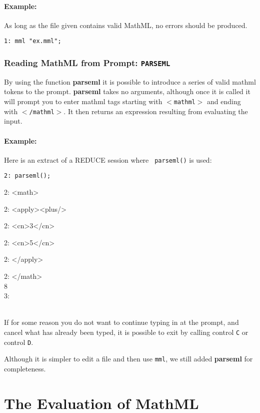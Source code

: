 \documentclass{article}
\begin{document}
\paragraph{Example:} As long as the file given contains valid MathML, no
errors should be produced.  

{\tt 1:  mml "ex.mml";}

\subsubsection{Reading MathML from Prompt: {\tt PARSEML}}

By using the function {\bf parseml} it is possible to introduce a series of
valid mathml tokens to the prompt. {\bf parseml} takes no arguments,
although once it is called it will prompt you to enter mathml tags starting
with {\tt $<$mathml$>$} and ending with {\tt $<$/mathml$>$}. It then returns
an expression resulting from evaluating the input. \\

\paragraph{Example:} Here is an extract of a REDUCE session where {\tt
parseml()} is used:\\

{\tt 2: parseml(); 

2: <math> 

2: <apply><plus/> 

2: <cn>3</cn> 

2: <cn>5</cn> 

2: </apply> 

2: </math> 
\\

\hspace*{1cm}  8 \\

3: } \\

If for some reason you do not want to continue typing in at the prompt, and
cancel what has already been typed, it is possible to exit by calling 
control {\tt C} or control {\tt D}.

Although it is simpler to edit a file and then use {\tt mml}, we still
added {\bf parseml} for completeness.     


\section{The Evaluation of MathML}
\end{document}
